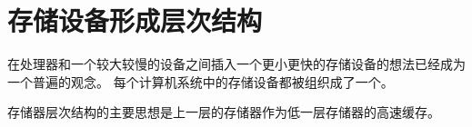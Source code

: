 
\section{存储设备形成层次结构}
{
    在处理器和一个较大较慢的设备之间插入一个更小更快的存储设备的想法已经成为一个普遍的观念。
    每个计算机系统中的存储设备都被组织成了一个。

    存储器层次结构的主要思想是上一层的存储器作为低一层存储器的高速缓存。
}
